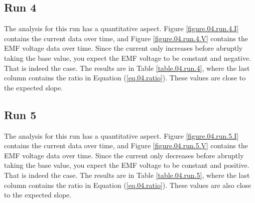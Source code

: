 \subsection{Run 4}
%
The analysis for this run has a quantitative aspect. Figure \ref{figure.04.run.4.I} contains the current data over time, and Figure \ref{figure.04.run.4.V} contains the EMF voltage data over time. Since the current only increases before abruptly taking the base value, you expect the EMF voltage to be constant and negative. That is indeed the case. The results are in Table \ref{table.04.run.4}, where the last column contains the ratio in Equation (\ref{eq.04.ratio}). These values are close to the expected slope.
%
\subsection{Run 5}
%
The analysis for this run has a quantitative aspect. Figure \ref{figure.04.run.5.I} contains the current data over time, and Figure \ref{figure.04.run.5.V} contains the EMF voltage data over time. Since the current only decreases before abruptly taking the base value, you expect the EMF voltage to be constant and positive. That is indeed the case. The results are in Table \ref{table.04.run.5}, where the last column contains the ratio in Equation (\ref{eq.04.ratio}). These values are also close to the expected slope.
%
